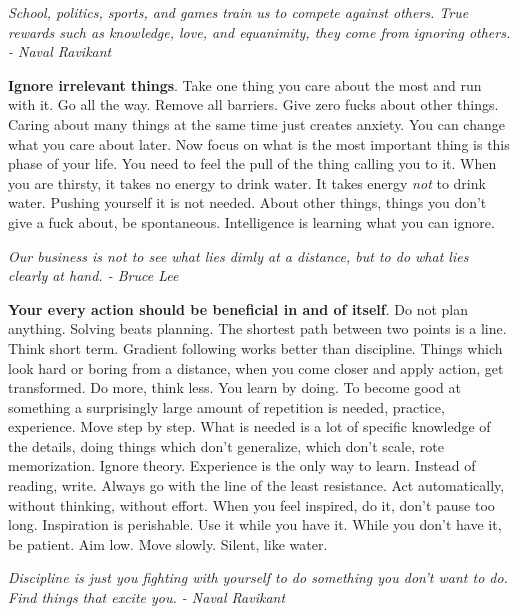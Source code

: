 \documentclass[a4paper,hidelinks]{article}
\begin{document}
\newpage

\begin{center}
\textit{School, politics, sports, and games train us to compete against others. True rewards such as knowledge, love, and equanimity, they come from ignoring others. - Naval Ravikant}
\end{center}

\textbf{Ignore irrelevant things}.
Take one thing you care about the most and run with it.
Go all the way.
Remove all barriers.
Give zero fucks about other things.
Caring about many things at the same time just creates anxiety.
You can change what you care about later.
Now focus on what is the most important thing is this phase of your life.
You need to feel the pull of the thing calling you to it.
When you are thirsty, it takes no energy to drink water.
It takes energy \textit{not} to drink water.
Pushing yourself it is not needed.
About other things, things you don't give a fuck about, be spontaneous.
Intelligence is learning what you can ignore.

\newpage

\begin{center}
\textit{Our business is not to see what lies dimly at a distance, but to do what lies clearly at hand. - Bruce Lee}
\end{center}

\textbf{Your every action should be beneficial in and of itself}.
Do not plan anything.
Solving beats planning.
The shortest path between two points is a line.
Think short term.
Gradient following works better than discipline.
Things which look hard or boring from a distance, when you come closer and apply action, get transformed.
Do more, think less.
You learn by doing.
To become good at something a surprisingly large amount of repetition is needed, practice, experience.
Move step by step.
What is needed is a lot of specific knowledge of the details, doing things which don't generalize, which don't scale, rote memorization.
Ignore theory.
Experience is the only way to learn.
Instead of reading, write.
Always go with the line of the least resistance.
Act automatically, without thinking, without effort.
When you feel inspired, do it, don't pause too long.
Inspiration is perishable.
Use it while you have it.
While you don't have it, be patient.
Aim low.
Move slowly.
Silent, like water.

\newpage

\begin{center}
\textit{Discipline is just you fighting with yourself to do something you don't want to do. Find things that excite you. - Naval Ravikant}
\end{center}
\end{document}
